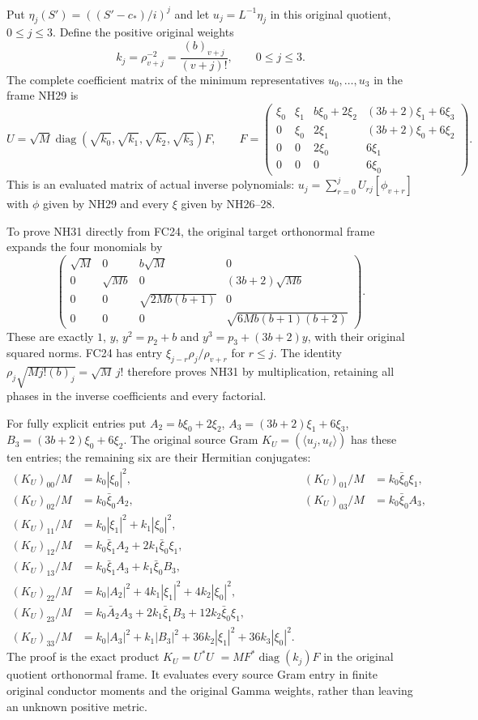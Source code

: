 \documentclass[11pt]{article}
\newcommand{\diag}{\operatorname{diag}}
\begin{document}
Put $\eta_j(S')=((S'-c_*)/i)^j$ and let
$u_j=L^{-1}\eta_j$ in this original quotient, $0\le j\le3$.
Define the positive original weights
\[
 k_j=\rho_{v+j}^{-2}=\frac{(b)_{v+j}}{(v+j)!},
 \qquad 0\le j\le3.
 \tag{NH30}
\]
The complete coefficient matrix of the minimum representatives
$u_0,\ldots,u_3$ in the frame NH29 is
\[
 U=\sqrt M\diag(\sqrt{k_0},\sqrt{k_1},\sqrt{k_2},\sqrt{k_3})F,
 \qquad
 F=\begin{pmatrix}
 \xi_0&\xi_1&b\xi_0+2\xi_2&(3b+2)\xi_1+6\xi_3\\
 0&\xi_0&2\xi_1&(3b+2)\xi_0+6\xi_2\\
 0&0&2\xi_0&6\xi_1\\
 0&0&0&6\xi_0
 \end{pmatrix}.
 \tag{NH31}
\]
This is an evaluated matrix of actual inverse polynomials:
$u_j=\sum_{r=0}^jU_{rj}[\phi_{v+r}]$ with $\phi$ given
by NH29 and every $\xi$ given by NH26--28.

To prove NH31 directly from FC24, the original target
orthonormal frame expands the four monomials by
\[
 \begin{pmatrix}
 \sqrt M&0&b\sqrt M&0\\
 0&\sqrt{Mb}&0&(3b+2)\sqrt{Mb}\\
 0&0&\sqrt{2Mb(b+1)}&0\\
 0&0&0&\sqrt{6Mb(b+1)(b+2)}
 \end{pmatrix}.
 \tag{NH32}
\]
These are exactly $1$, $y$, $y^2=p_2+b$ and
$y^3=p_3+(3b+2)y$, with their original squared norms.
FC24 has entry $\xi_{j-r}\rho_j/\rho_{v+r}$ for $r\le j$.
The identity
$\rho_j\sqrt{Mj!(b)_j}=\sqrt M\,j!$
therefore proves NH31 by multiplication, retaining all phases
in the inverse coefficients and every factorial.

For fully explicit entries put
$A_2=b\xi_0+2\xi_2$, $A_3=(3b+2)\xi_1+6\xi_3$,
$B_3=(3b+2)\xi_0+6\xi_2$. The original source Gram
$K_U=(\langle u_j,u_\ell\rangle)$ has these ten entries;
the remaining six are their Hermitian conjugates:
\[
\begin{aligned}
 (K_U)_{00}/M&=k_0|\xi_0|^2,&
 (K_U)_{01}/M&=k_0\bar\xi_0\xi_1,\\
 (K_U)_{02}/M&=k_0\bar\xi_0A_2,&
 (K_U)_{03}/M&=k_0\bar\xi_0A_3,\\
 (K_U)_{11}/M&=k_0|\xi_1|^2+k_1|\xi_0|^2,\\
 (K_U)_{12}/M&=k_0\bar\xi_1A_2+2k_1\bar\xi_0\xi_1,\\
 (K_U)_{13}/M&=k_0\bar\xi_1A_3+k_1\bar\xi_0B_3,\\
 (K_U)_{22}/M&=k_0|A_2|^2+4k_1|\xi_1|^2+4k_2|\xi_0|^2,\\
 (K_U)_{23}/M&=k_0\bar A_2A_3+2k_1\bar\xi_1B_3
                                       +12k_2\bar\xi_0\xi_1,\\
 (K_U)_{33}/M&=k_0|A_3|^2+k_1|B_3|^2
                                +36k_2|\xi_1|^2+36k_3|\xi_0|^2.
\end{aligned}\tag{NH33}
\]
The proof is the exact product $K_U=U^*U$
$=MF^*\diag(k_j)F$ in the original quotient orthonormal
frame. It evaluates every source Gram entry in finite original
conductor moments and the original Gamma weights, rather
than leaving an unknown positive metric.
\end{document}
